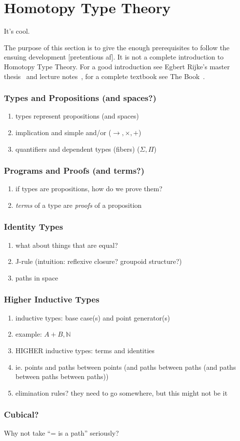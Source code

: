 \chapter{Homotopy Type Theory}
It's cool.~\cite{hottbook}

The purpose of this section is to give the enough prerequisites to follow the
ensuing development [pretentious af]. It is not a complete introduction to
Homotopy Type Theory. For a good introduction see Egbert Rijke's master thesis~\cite{Rijke2012}
and lecture notes~\cite{Rijke2019}, for a complete textbook see The
Book~\cite{hottbook}.

\subsection{Types and Propositions (and spaces?)}
\begin{enumerate}
  \item types represent propositions (and spaces)
  \item implication and simple and/or ($\rightarrow, \times, +$)
  \item quantifiers and dependent types (fibers) ($\Sigma, \Pi$)
\end{enumerate}

\subsection{Programs and Proofs (and terms?)}
\begin{enumerate}
  \item if types are propositions, how do we prove them?
  \item \emph{terms} of a type are \emph{proofs} of a proposition
\end{enumerate}

\subsection{Identity Types}
\begin{enumerate}
  \item what about things that are equal?
  \item J-rule (intuition: reflexive closure? groupoid structure?)
  \item paths in space
\end{enumerate}

\subsection{Higher Inductive Types}
\begin{enumerate}
  \item inductive types: base case(s) and point generator(s)
  \item example: $A + B, \mathbb{N}$
  \item HIGHER inductive types: terms and identities
  \item ie. points and paths between points (and paths between paths (and
    paths between paths between paths))
  \item elimination rules? they need to go somewhere, but this might not be it
\end{enumerate}

\subsection{Cubical?}
Why not take ``= is a path'' seriously?